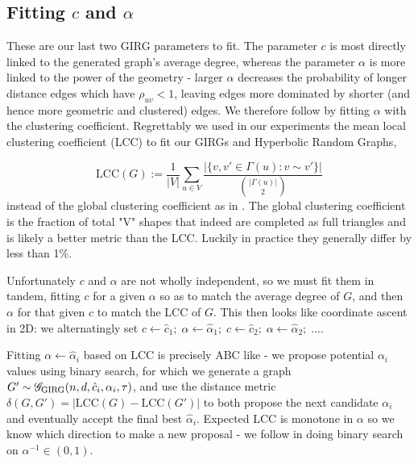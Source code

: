 \subsection{Fitting $c$ and $\alpha$}
These are our last two GIRG parameters to fit.
The parameter $c$ is most directly linked to the generated graph's average degree, whereas the parameter $\alpha$ is more linked to the power of the geometry - larger $\alpha$ decreases the probability of longer distance edges which have $\rho_{uv} < 1$, leaving edges more dominated by shorter (and hence more geometric and clustered) edges. We therefore follow \cite{blasius2018towards} by fitting $\alpha$ with the clustering coefficient. Regrettably we used in our experiments the mean local clustering coefficient (LCC) to fit our GIRGs and Hyperbolic Random Graphs, 

\begin{equation}
    \mathrm{LCC}(G) := \frac{1}{|V|} \sum_{u \in V} 
    \frac{| \{ v, v' \in \Gamma(u): v \sim v'\} |}{{|\Gamma(u)| \choose 2}}
\end{equation}
instead of the global clustering coefficient as in \cite{blasius2018towards}. The global clustering coefficient is the fraction of total "V" shapes that indeed are completed as full triangles and is likely a better metric than the LCC. Luckily in practice they generally differ by less than 1\%.

Unfortunately $c$ and $\alpha$ are not wholly independent, so we must fit them in tandem, fitting $c$ for a given $\alpha$ so as to match the average degree of $G$, and then $\alpha$ for that given $c$ to match the LCC of $G$. This then looks like coordinate ascent in 2D: we alternatingly set $c \gets \hat{c}_1;\; \alpha \gets \hat{\alpha}_1;\; c \gets \hat{c}_2;\; \alpha \gets \hat{\alpha}_2;\; ...$.

Fitting $\alpha \gets \hat{\alpha}_i$ based on LCC is precisely ABC like - we propose potential $\alpha_i$ values using binary search, for which we generate a graph $G' \sim \mathscr{G}_{\mathrm{GIRG}}(n, d, \hat{c}_i, \alpha_i, \tau)$, and use the distance metric $\delta(G, G') = |\mathrm{LCC}(G) - \mathrm{LCC}(G')|$ to both propose the next candidate $\alpha_i$ and eventually accept the final best $\hat{\alpha}_i$. Expected LCC is monotone in $\alpha$ so we know which direction to make a new proposal - we follow \cite{blasius2018towards} in doing binary search on $\alpha^{-1} \in (0, 1)$.


